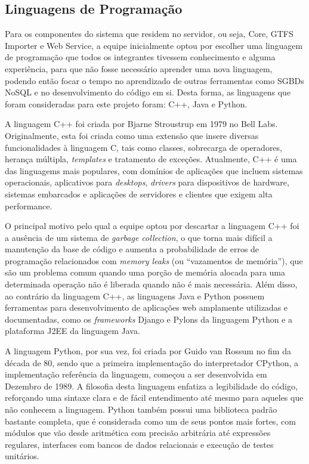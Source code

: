 \subsection{Linguagens de Programação}

Para os componentes do sistema que residem no servidor, ou seja, Core, GTFS Importer e Web Service, a equipe inicialmente optou por escolher uma linguagem de programação que todos os integrantes tivessem conhecimento e alguma experiência, para que não fosse necessário aprender uma nova linguagem, podendo então focar o tempo no aprendizado de outras ferramentas como SGBDs NoSQL e no desenvolvimento do código em si.
Desta forma, as linguagens que foram consideradas para este projeto foram: C++, Java e Python.


A linguagem C++ foi criada por Bjarne Stroustrup em 1979 no Bell Labs.
Originalmente, esta foi criada como uma extensão que insere diversas funcionalidades à linguagem C, tais como classes, sobrecarga de operadores, herança múltipla, \emph{templates} e tratamento de exceções.
Atualmente, C++ é uma das linguagems mais populares, com domínios de aplicações que incluem sistemas operacionais, aplicativos para \emph{desktops}, \emph{drivers} para dispositivos de hardware, sistemas embarcados e aplicações de servidores e clientes que exigem alta performance.

O principal motivo pelo qual a equipe optou por descartar a linguagem C++ foi a ausência de um sistema de \emph{garbage collection}, o que torna mais difícil a manutenção da base de código e aumenta a probabilidade de erros de programação relacionados com \emph{memory leaks} (ou ``vazamentos de memória''), que são um problema comum quando uma porção de memória alocada para uma determinada operação não é liberada quando não é mais necessária.
Além disso, ao contrário da linguagem C++, as linguagens Java e Python possuem ferramentas para desenvolvimento de aplicações web amplamente utilizadas e documentadas, como os \emph{frameworks} Django e Pylons da linguagem Python e a plataforma J2EE da linguagem Java.

A linguagem Python, por sua vez, foi criada por Guido van Rossum no fim da década de 80, sendo que a primeira implementação do interpretador CPython, a implementação referência da linguagem, começou a ser desenvolvida em Dezembro de 1989.
A filosofia desta linguagem enfatiza a legibilidade do código, reforçando uma sintaxe clara e de fácil entendimento até mesmo para aqueles que não conhecem a linguagem.
Python também possui uma biblioteca padrão bastante completa, que é considerada como um de seus pontos mais fortes, com módulos que vão desde aritmética com precisão arbitrária até expressões regulares, interfaces com bancos de dados relacionais e execução de testes unitários.

